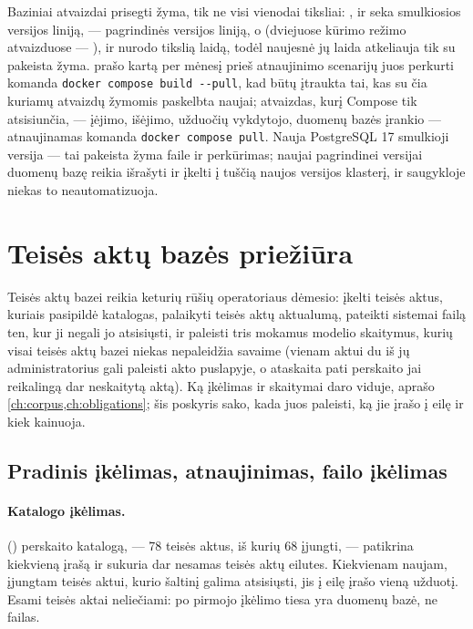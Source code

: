 Baziniai atvaizdai prisegti žyma, tik ne visi vienodai tiksliai: ,
 ir  seka smulkiosios versijos liniją,
 --- pagrindinės versijos liniją, o  (dviejuose
kūrimo režimo atvaizduose --- ),  ir
 nurodo tikslią laidą, todėl naujesnė jų laida atkeliauja
tik su pakeista žyma.
 prašo kartą per mėnesį prieš atnaujinimo scenarijų juos perkurti
komanda \texttt{docker compose build -{}-pull}, kad būtų įtraukta tai, kas su čia kuriamų atvaizdų
žymomis paskelbta naujai; atvaizdas, kurį Compose tik atsisiunčia, --- įėjimo, išėjimo, užduočių
vykdytojo, duomenų bazės įrankio --- atnaujinamas komanda \texttt{docker compose pull}. Nauja
PostgreSQL 17 smulkioji versija --- tai pakeista žyma faile  ir
perkūrimas; naujai pagrindinei versijai duomenų bazę reikia išrašyti ir įkelti į tuščią naujos
versijos klasterį, ir saugykloje niekas to neautomatizuoja.


\section{Teisės aktų bazės priežiūra}\label{sec:ops:corpus}

Teisės aktų bazei reikia keturių rūšių operatoriaus dėmesio: įkelti teisės aktus, kuriais pasipildė
katalogas, palaikyti teisės aktų aktualumą, pateikti sistemai failą ten, kur ji negali jo
atsisiųsti, ir paleisti tris mokamus modelio skaitymus, kurių visai teisės aktų bazei niekas nepaleidžia
savaime (vienam aktui du iš jų administratorius gali paleisti akto puslapyje, o ataskaita pati
perskaito jai reikalingą dar neskaitytą aktą). Ką
įkėlimas ir skaitymai daro viduje, aprašo \cref{ch:corpus,ch:obligations}; šis poskyris sako, kada
juos paleisti, ką jie įrašo į eilę ir kiek kainuoja.

\subsection{Pradinis įkėlimas, atnaujinimas, failo įkėlimas}

\paragraph{Katalogo įkėlimas.} 
() perskaito katalogą,
 --- 78 teisės aktus, iš kurių 68 įjungti, --- patikrina kiekvieną įrašą
ir sukuria dar nesamas teisės aktų eilutes. Kiekvienam naujam, įjungtam teisės aktui, kurio šaltinį
galima atsisiųsti, jis į eilę įrašo vieną  užduotį. Esami teisės aktai
neliečiami: po pirmojo įkėlimo tiesa yra duomenų bazė, ne failas.

